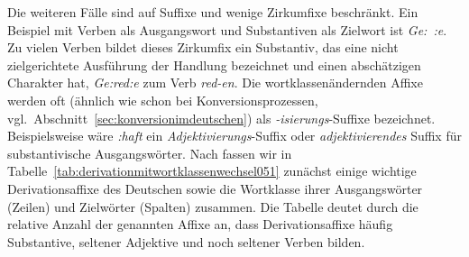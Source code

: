 Die weiteren Fälle sind auf Suffixe und wenige Zirkumfixe beschränkt.
Ein Beispiel mit Verben als Ausgangswort und Substantiven als Zielwort ist \textit{Ge:~:e}.
Zu vielen Verben bildet dieses Zirkumfix ein Substantiv, das eine nicht zielgerichtete Ausführung der Handlung bezeichnet und einen abschätzigen Charakter hat, \zB \textit{Ge:red:e} zum Verb \textit{red-en}.
Die wortklassenändernden Affixe werden oft (ähnlich wie schon bei Konversionsprozessen, vgl.\ Abschnitt~\ref{sec:konversionimdeutschen}) als \textit{-isierungs}-Suffixe bezeichnet.
Beispielsweise wäre \textit{:haft} ein \textit{Adjektivierungs}-Suffix oder \textit{adjektivierendes} Suffix für substantivische Ausgangswörter.
Nach \citet[267]{Eisenberg2013a} fassen wir in Tabelle~\ref{tab:derivationmitwortklassenwechsel051} zunächst einige wichtige Derivationsaffixe des Deutschen sowie die Wortklasse ihrer Ausgangswörter (Zeilen) und Zielwörter (Spalten) zusammen.
Die Tabelle deutet durch die relative Anzahl der genannten Affixe an, dass Derivationsaffixe häufig Substantive, seltener Adjektive und noch seltener Verben bilden.


